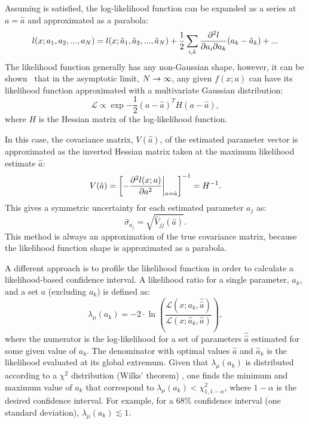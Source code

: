 Assuming  is satisfied, the log-likelihood function can be expanded as a series at $a=\hat{a}$ and approximated as a parabola:
\begin{equation}
    l(x;a_1,a_2,...,a_N) = l(x;\hat{a}_1,\hat{a}_2,...,\hat{a}_N) + \frac{1}{2}\sum_{i,k} \pdv{l}{a_i}{a_k} (a_i-\hat{a}_i)(a_k-\hat{a}_k)+...
\end{equation}
The likelihood function generally has any non-Gaussian shape, however, it can be shown~\cite{James_2006} that in the asymptotic limit, $N\rightarrow\infty$, 
any given $f(x;a)$ can have its likelihood function approximated with a multivariate Gaussian distribution:
\begin{equation}
    \mathcal{L} \propto \exp{-\frac{1}{2}(a-\hat{a})^T H(a-\hat{a})},
\end{equation}
where $H$ is the Hessian matrix of the log-likelihood function. 

In this case, the covariance matrix, $V(\hat{a})$, of the estimated parameter vector is approximated as the inverted Hessian matrix taken at the maximum likelihood estimate $\hat{a}$:
\begin{equation}
    V(\hat{a}) = \left[-\pdv[2]{l(x;a)}{a}\middle|^{}_{\ds a=\hat{a}}\right]^{-1} = H^{-1}.
\end{equation}
This gives a symmetric uncertainty for each estimated parameter $a_j$ as:
\begin{equation}
    \hat{\sigma}_{a_j} = \sqrt{\hat{V}_{jj}(\hat{a})}.
\end{equation}
This method is always an approximation of the true covariance matrix, because the likelihood function shape is approximated as a parabola.

A different approach is to profile the likelihood function in order to calculate a likelihood-based confidence interval.
A likelihood ratio for a single parameter, $a_k$, and a set $a$ (excluding $a_k$) is defined as:
\begin{equation}\label{eq:profile}
    \lambda_{\mu}(a_k) = -2 \cdot \ln\left(\frac{\mathcal{L}(x;a_k,\hat{\hat{a}})}{\mathcal{L}(x;\hat{a}_k,\hat{a})}\right),
\end{equation} 
where the numerator is the log-likelihood for a set of parameters $\hat{\hat{a}}$ estimated for some given value of $a_k$.
The denominator with optimal values $\hat{a}$ and $\hat{a}_k$ is the likelihood evaluated at its global extremum. 
Given that $\lambda_{\mu}(a_k)$ is distributed according to a $\chi^2$ distribution (Wilks' theorem) \cite{Wilks:1938dza},
one finds the minimum and maximum value of $a_k$ that correspond to $\lambda_{\mu}(a_k)<\chi^2_{1,1-\alpha}$, where $1-\alpha$ is the desired confidence interval.
For example, for a 68\% confidence interval (one standard deviation), $\lambda_{\mu}(a_k)\lesssim1$.

